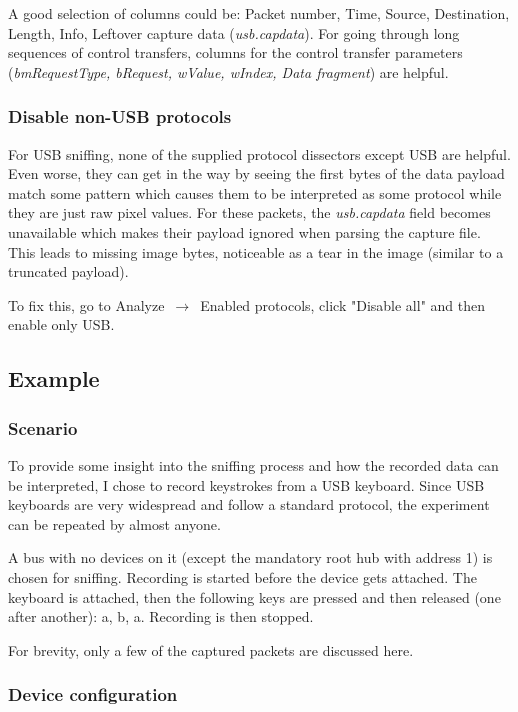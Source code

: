 \documentclass{article}
\begin{document}
A good selection of columns could be:
Packet number, Time, Source, Destination,
Length, Info, Leftover capture data ({\it usb.capdata}).
For going through long sequences of control transfers, columns for the control transfer parameters
({\it bmRequestType, bRequest, wValue, wIndex, Data fragment}) are helpful.

\subsubsection{Disable non-USB protocols}
\label{nonusb}

For USB sniffing, none of the supplied protocol dissectors except USB are helpful.
Even worse, they can get in the way by seeing the first bytes of the data payload match
some pattern which causes them to be interpreted as some protocol while they are just raw pixel
values. For these packets, the {\it usb.capdata} field becomes unavailable which makes their
payload ignored when parsing the capture file. This leads to missing image bytes, noticeable
as a tear in the image (similar to a truncated payload).

To fix this, go to {Analyze $\,\to\,$ Enabled protocols}, click "Disable all" and
then enable only USB. \cite[Section 10.4]{wireshark_userguide}

\subsection{Example}

\subsubsection{Scenario}

To provide some insight into the sniffing process and how the recorded data can be
interpreted, I chose to record keystrokes from a USB keyboard. Since USB keyboards
are very widespread and follow a standard protocol, the experiment can be repeated
by almost anyone.

A bus with no devices on it (except the mandatory root hub with address 1) is chosen
for sniffing.
Recording is started before the device gets attached.
The keyboard is attached, then the following keys are pressed and
then released (one after another): a, b, a. Recording is then stopped.

For brevity, only a few of the captured packets are discussed here.

\subsubsection{Device configuration}
\end{document}
